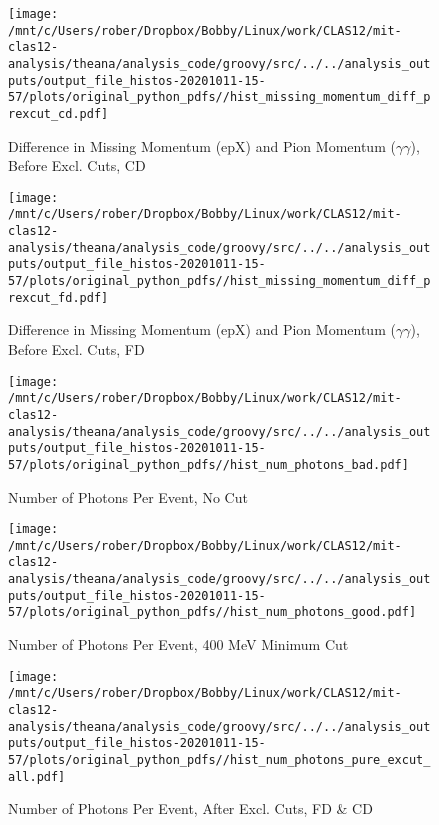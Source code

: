 \documentclass{article}
\begin{document}
\begin{landscape}
\begin{figure}[h]
        \texttt{[image: /mnt/c/Users/rober/Dropbox/Bobby/Linux/work/CLAS12/mit-clas12-analysis/theana/analysis\_code/groovy/src/../../analysis\_outputs/output\_file\_histos-20201011-15-57/plots/original\_python\_pdfs//hist\_missing\_momentum\_diff\_prexcut\_cd.pdf]}
        \captionsetup{textformat=empty,labelformat=blank}
        \caption{Difference in Missing Momentum (epX) and Pion Momentum ($\gamma$$\gamma$), Before Excl. Cuts, CD}
    \end{figure}
    \clearpage
    
    \begin{figure}[h]
        \centering

        \texttt{[image: /mnt/c/Users/rober/Dropbox/Bobby/Linux/work/CLAS12/mit-clas12-analysis/theana/analysis\_code/groovy/src/../../analysis\_outputs/output\_file\_histos-20201011-15-57/plots/original\_python\_pdfs//hist\_missing\_momentum\_diff\_prexcut\_fd.pdf]}
        \captionsetup{textformat=empty,labelformat=blank}
        \caption{Difference in Missing Momentum (epX) and Pion Momentum ($\gamma$$\gamma$), Before Excl. Cuts, FD}
    \end{figure}
    \clearpage
    
    \begin{figure}[h]
        \centering

        \texttt{[image: /mnt/c/Users/rober/Dropbox/Bobby/Linux/work/CLAS12/mit-clas12-analysis/theana/analysis\_code/groovy/src/../../analysis\_outputs/output\_file\_histos-20201011-15-57/plots/original\_python\_pdfs//hist\_num\_photons\_bad.pdf]}
        \captionsetup{textformat=empty,labelformat=blank}
        \caption{Number of Photons Per Event, No Cut}
    \end{figure}
    \clearpage
    
    \begin{figure}[h]
        \centering

        \texttt{[image: /mnt/c/Users/rober/Dropbox/Bobby/Linux/work/CLAS12/mit-clas12-analysis/theana/analysis\_code/groovy/src/../../analysis\_outputs/output\_file\_histos-20201011-15-57/plots/original\_python\_pdfs//hist\_num\_photons\_good.pdf]}
        \captionsetup{textformat=empty,labelformat=blank}
        \caption{Number of Photons Per Event, 400 MeV Minimum Cut}
    \end{figure}
    \clearpage
    
    \begin{figure}[h]
        \centering

        \texttt{[image: /mnt/c/Users/rober/Dropbox/Bobby/Linux/work/CLAS12/mit-clas12-analysis/theana/analysis\_code/groovy/src/../../analysis\_outputs/output\_file\_histos-20201011-15-57/plots/original\_python\_pdfs//hist\_num\_photons\_pure\_excut\_all.pdf]}
        \captionsetup{textformat=empty,labelformat=blank}
        \caption{Number of Photons Per Event, After Excl. Cuts, FD \& CD}
    \end{figure}
    \clearpage
    

\end{landscape}
\end{document}
